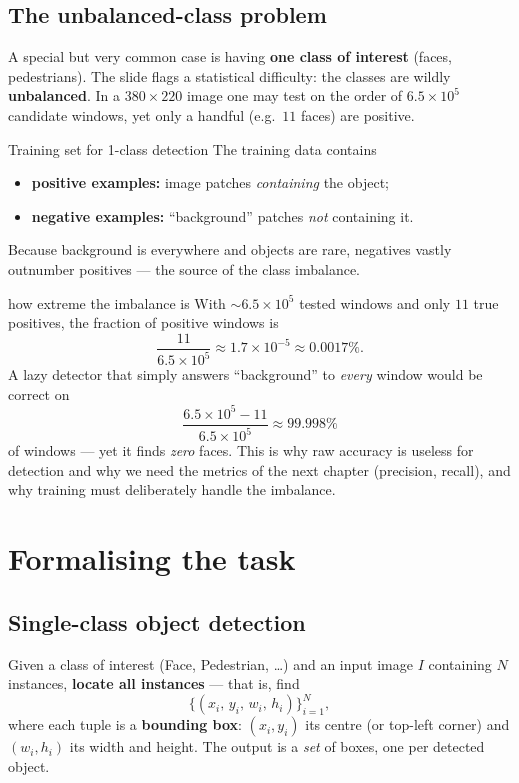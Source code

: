 \documentclass{report}
\begin{document}
\subsection{The unbalanced-class problem}

A special but very common case is having \textbf{one class of interest} (faces,
pedestrians). The slide flags a statistical difficulty: the classes are wildly
\textbf{unbalanced}. In a $380\times220$ image one may test on the order of
$6.5\times10^{5}$ candidate windows, yet only a handful (e.g.\ $11$ faces) are
positive.

\begin{defbox}{Training set for 1-class detection}
The training data contains
\begin{itemize}
\item \textbf{positive examples:} image patches \emph{containing} the object;
\item \textbf{negative examples:} ``background'' patches \emph{not} containing
it.
\end{itemize}
Because background is everywhere and objects are rare, negatives vastly
outnumber positives --- the source of the class imbalance.
\end{defbox}

\begin{exbox}{how extreme the imbalance is}
With $\sim 6.5\times10^{5}$ tested windows and only $11$ true positives, the
fraction of positive windows is
\[
\frac{11}{6.5\times10^{5}} \approx 1.7\times10^{-5} \approx 0.0017\% .
\]
A lazy detector that simply answers ``background'' to \emph{every} window would
be correct on
\[
\frac{6.5\times10^{5}-11}{6.5\times10^{5}} \approx 99.998\%
\]
of windows --- yet it finds \emph{zero} faces. This is why raw accuracy is
useless for detection and why we need the metrics of the next chapter
(precision, recall), and why training must deliberately handle the imbalance.
\end{exbox}

\section{Formalising the task}

\subsection{Single-class object detection}

Given a class of interest (Face, Pedestrian, \dots) and an input image $I$
containing $N$ instances, \textbf{locate all instances} --- that is, find
\[
\{(x_i,\,y_i,\,w_i,\,h_i)\}_{i=1}^{N},
\]
where each tuple is a \textbf{bounding box}: $(x_i,y_i)$ its centre (or
top-left corner) and $(w_i,h_i)$ its width and height. The output is a
\emph{set} of boxes, one per detected object.
\end{document}
